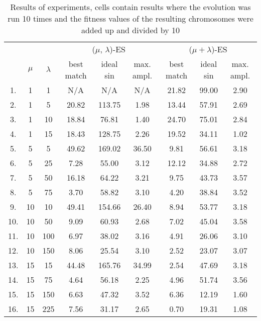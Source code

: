 \begin{table}[H]
\centering
\begin{tabular}{@{}ccccccccc@{}}
\toprule
    &       &           & \multicolumn{3}{c}{($\mu$, $\lambda$)-ES} & \multicolumn{3}{c}{($\mu + \lambda$)-ES} \\
   \cmidrule(lr){4-6} \cmidrule(lr){7-9}
    & $\mu$ & $\lambda$ & best match & ideal sin & max. ampl.       & best match & ideal sin  & max. ampl.     \\
   \midrule
1.  & 1     & 1         & N/A        & N/A       & N/A              & 21.82      & 99.00      & 2.90           \\
2.  & 1     & 5         & 20.82      & 113.75    & 1.98             & 13.44      & 57.91      & 2.69           \\
3.  & 1     & 10        & 18.84      & 76.81     & 1.40             & 24.70      & 75.01      & 2.84           \\
4.  & 1     & 15        & 18.43      & 128.75    & 2.26             & 19.52      & 34.11      & 1.02           \\
5.  & 5     & 5         & 49.62      & 169.02    & 36.50            & 9.81       & 56.61      & 3.18           \\
6.  & 5     & 25        & 7.28       & 55.00     & 3.12             & 12.12      & 34.88      & 2.72           \\
7.  & 5     & 50        & 16.18      & 64.22     & 3.21             & 9.75       & 43.73      & 3.57           \\
8.  & 5     & 75        & 3.70       & 58.82     & 3.10             & 4.20       & 38.84      & 3.52           \\
9.  & 10    & 10        & 49.41      & 154.66    & 26.40            & 8.94       & 53.77      & 3.18           \\
10. & 10    & 50        & 9.09       & 60.93     & 2.68             & 7.02       & 45.04      & 3.58           \\
11. & 10    & 100       & 6.97       & 38.02     & 3.16             & 4.91       & 26.06      & 3.10           \\
12. & 10    & 150       & 8.06       & 25.54     & 3.10             & 2.52       & 23.07      & 3.07           \\
13. & 15    & 15        & 44.48      & 165.76    & 34.99            & 2.54       & 47.69      & 3.18           \\
14. & 15    & 75        & 4.64       & 56.18     & 2.25             & 4.96       & 51.74      & 3.56           \\
15. & 15    & 150       & 6.63       & 47.32     & 3.52             & 6.36       & 12.19      & 1.60           \\
16. & 15    & 225       & 7.56       & 31.17     & 2.65             & 0.70       & 19.31      & 1.08           \\
    \bottomrule
\end{tabular}
\caption{Results of experiments, cells contain results where the evolution was run 10 times and the fitness values of the resulting chromosomes were added up and divided by 10}
\label{experiments-results}
\end{table}


